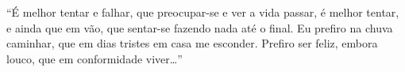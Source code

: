 “É melhor tentar e falhar, que preocupar-se e ver a vida passar, 
é melhor tentar, e ainda que em vão, que sentar-se fazendo nada até o final.
Eu prefiro na chuva caminhar, que em dias tristes em casa me esconder.
Prefiro ser feliz, embora louco, que em conformidade viver…”


